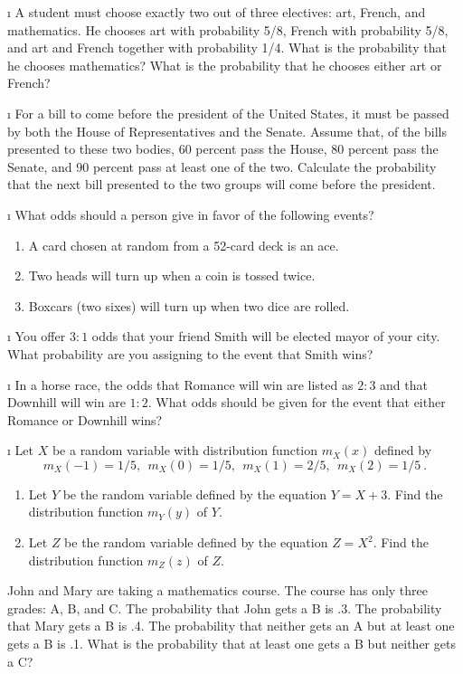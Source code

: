 \begin{LJSItem}
\i\label{exer 1.2.9} A student must choose exactly two out of three
electives: art, French,
and mathematics.  He chooses art with probability 5/8, French with
probability
5/8, and art and French together with probability 1/4.  What is the
probability
that he chooses mathematics?  What is the probability that he chooses either
art or French?

\i\label{exer 1.2.10} For a bill to come before the president of the
United States, it must
be passed by both the House of Representatives and the Senate.  Assume that,
of
the bills presented to these two bodies, 60 percent pass the House, 80
percent
pass the Senate, and 90 percent pass at least one of the two.  Calculate the
probability that the next bill presented to the two groups will come before
the
president.

\i\label{exer 1.2.11} What odds should a person give in favor of the
following events?
\begin{enumerate}
\item A card chosen at random from a 52-card deck is an ace.
\item Two heads will turn up when a coin is tossed twice.
\item Boxcars (two sixes) will turn up when two dice are rolled.
\end{enumerate}

\i\label{exer 1.2.12} You offer $3 : 1$ odds that your friend Smith will
be elected mayor
of your city.  What probability are you assigning to the event that Smith
wins?

\i\label{exer 1.2.13} In a horse race, the odds that Romance will win are
listed as $2 :
3$ and that Downhill will win are $1 : 2$.  What odds should be given for
the event that either Romance or Downhill wins?

\i\label{exer 1.2.13.1} Let $X$ be a random variable with distribution function
$m_X(x)$ defined by
$$
m_X(-1) = 1/5,\ \  m_X(0) = 1/5,\ \ m_X(1) = 2/5,\ \  m_X(2) = 1/5\ .
$$
\begin{enumerate}
\item Let $Y$ be the random variable defined by the equation $Y = X + 3$.  Find the
distribution function $m_Y(y)$ of $Y$.
\item Let $Z$ be the random variable defined by the equation $Z = X^2$.  Find the 
distribution function $m_Z(z)$ of $Z$.
\end{enumerate}

\istar\label{exer 1.2.14} John and Mary are taking a mathematics course.  The
course has only
three grades: A, B, and C.  The probability that John gets a B is .3.  The
probability that Mary gets a B is .4.  The probability that neither gets an A
but at least one gets a B is .1.  What is the probability that at least one
gets a B but neither gets a C?


\end{LJSItem}
